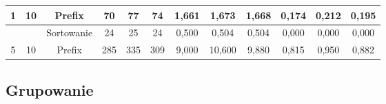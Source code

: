 \documentclass[licencjacka]{pracamgr}
\begin{document}
\begin{table}[H]
{\begin{tabular}{@{}cccccccccccc@{}}
1                                                               & 10                                                      & Prefix     & 70                                                      & 77                                                      & 74                                                         & 1,661                                                      & 1,673                                                      & 1,668                                                          & 0,174                                                              & 0,212                                                               & 0,195                                                                 \\ \midrule
                                                                &                                                         & Sortowanie & 24                                                      & 25                                                      & 24                                                         & 0,500                                                      & 0,504                                                      & 0,504                                                          & 0,000                                                              & 0,000                                                               & 0,000                                                                 \\
5                                                               & 10                                                      & Prefix     & 285                                                     & 335                                                     & 309                                                        & 9,000                                                      & 10,600                                                     & 9,880                                                          & 0,815                                                              & 0,950                                                               & 0,882                                                                 \\ \bottomrule
\end{tabular}%
}
\end{table}

\subsection{Grupowanie}
\end{document}
